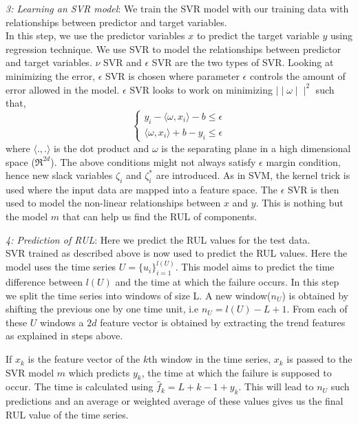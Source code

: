 \textit{3: Learning an SVR model}: We train the SVR model with our training data with relationships between predictor and target variables.\\
In this step, we use the predictor variables $x$ to predict the target variable $y$ using regression technique. We use SVR to model the relationships between predictor and target variables.
$\nu$ SVR and $\epsilon$ SVR are the two types of SVR. Looking at minimizing the error, $\epsilon$ SVR is chosen where parameter $\epsilon$ controls the amount of error allowed in the model. $\epsilon$ SVR looks to work on minimizing $\mid \mid \omega \mid \mid^{2}$ such that,
$$
    \begin{cases}
        y_{i} - \langle \omega,x_{i} \rangle - b \leq \epsilon \\
        \langle \omega,x_{i} \rangle + b - y_{i} \leq \epsilon
    \end{cases}
$$
where $\big \langle .,. \big \rangle$ is the dot product and $\omega$ is the separating plane in a high dimensional space ($\Re^{2d}$). The above conditions might not always satisfy $\epsilon$ margin condition, hence new slack variables $\zeta_{i}$ and $\zeta_{i}^{*}$ are introduced. As in SVM, the kernel trick is used where the input data are mapped into a feature space. The $\epsilon$ SVR is then used to model the non-linear relationships between $x$ and $y$. This is nothing but the model $m$ that can help us find the RUL of components.

\textit{4: Prediction of RUL}: Here we predict the RUL values for the test data.\\
SVR trained as described above is now used to predict the RUL values. Here the model uses the time series $U = \{u_{i}\}_{i = 1}^{l(U)}$. This model aims to predict the time difference between $l(U)$ and the time at which the failure occurs.
In this step we split the time series into windows of size L. A new window($n_{U}$) is obtained by shifting the previous one by one time unit, i.e $n_{U} = l(U) - L + 1$. From each of these $U$ windows a $2d$ feature vector is obtained by extracting the trend features as explained in steps above.

If $x_{k}$ is the feature vector of the $k$th window in the time series, $x_{k}$ is passed to the SVR model $m$ which predicts $y_{k}$, the time at which the failure is supposed to occur. The time is calculated using $\hat{f}_{k} = L + k - 1 + y_{k}$. This will lead to $n_{U}$ such predictions and an average or weighted average of these values gives us the final RUL value of the time series.

